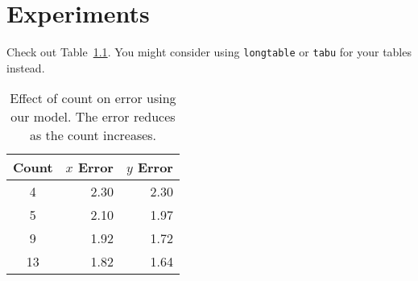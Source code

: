 \chapter{Experiments}
\label{ch:experiments}

Check out Table~\ref{tbl:calibration}. You might consider using
\texttt{longtable} or \texttt{tabu} for your tables instead.

\begin{table}
  \centering
  \small
  \begin{tabular}{crr}
    \hline
    Count & $x$ Error & $y$ Error\\\hline\hline
    4 & 2.30 & 2.30\\\hline
    5 & 2.10 & 1.97\\\hline
    9 & 1.92 & 1.72\\\hline
    13 & 1.82 & 1.64\\\hline
  \end{tabular}
  \caption[Effect of count on error]
    {Effect of count on error using our model. The error reduces as the count
    increases.}
  \label{tbl:calibration}
\end{table}

\lipsum
